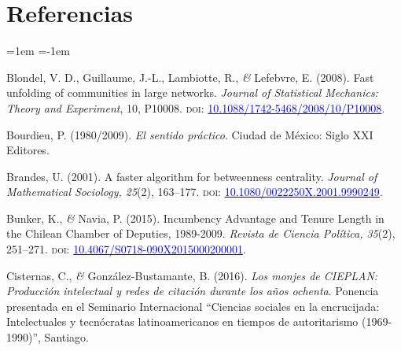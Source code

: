 \documentclass[a4paper]{tufte-handout}
\begin{document}
{


\section{{\normalfont Referencias}}


\begin{list}{}%
{\leftmargin=1em \itemindent=-1em}

\item{\small Blondel, V. D., Guillaume, J.-L., Lambiotte, R., {\itshape \&} Lefebvre, E. (2008). Fast unfolding of communities in large networks. {\itshape Journal of Statistical Mechanics: Theory and Experiment}, 10, P10008. {\scshape doi:} \href{https://arxiv.org/abs/0803.0476}{\textcolor{blue}{10.1088/1742-5468/2008/10/P10008}}.}

\item{\small Bourdieu, P. (1980/2009). {\itshape El sentido práctico}.  Ciudad de México: Siglo XXI Editores.}

\item{\small Brandes, U. (2001). A faster algorithm for betweenness centrality. {\itshape Journal of Mathematical Sociology, 25}(2), 163--177. {\scshape doi:} \href{https://doi.org/10.1080/0022250X.2001.9990249}{\textcolor{blue}{10.1080/0022250X.2001.9990249}}.}

\item{\small Bunker, K., {\itshape \&} Navia, P. (2015). Incumbency Advantage and Tenure Length in the Chilean Chamber of Deputies, 1989-2009. {\itshape Revista de Ciencia Política, 35}(2), 251--271. {\scshape doi:} \href{http://dx.doi.org/10.4067/S0718-090X2015000200001}{\textcolor{blue}{10.4067/S0718-090X2015000200001}}.}

\item{\small Cisternas, C., {\itshape \&} González-Bustamante, B. (2016). {\itshape Los monjes de CIEPLAN: Producción intelectual y redes de citación durante los años ochenta}. Ponencia presentada en el Seminario Internacional “Ciencias sociales en la encrucijada: Intelectuales y tecnócratas latinoamericanos en tiempos de autoritarismo (1969-1990)”, Santiago.}


\end{list}}
\end{document}
